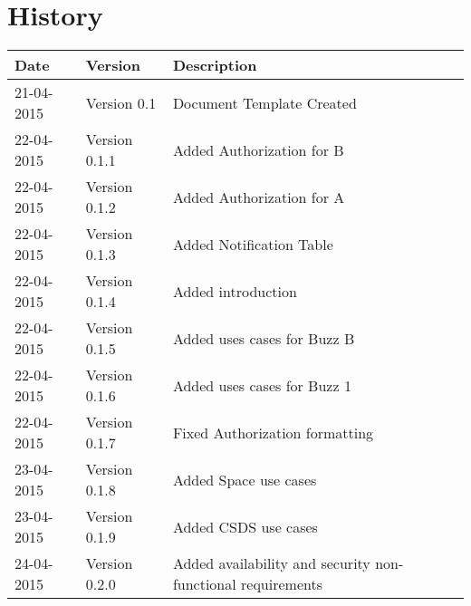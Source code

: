 \documentclass[12pt]{article}
\begin{document}


\section{History}
\begin{tabular}{|p{3cm}|p{5cm}|p{6cm}|}

\hline
Date & Version & Description\\ %
\hline
21-04-2015 & Version 0.1 & Document Template Created\\ %
\hline
22-04-2015 & Version 0.1.1 & Added Authorization for B\\ %
\hline
22-04-2015 & Version 0.1.2 & Added Authorization for A\\ %
\hline
22-04-2015 & Version 0.1.3 & Added Notification Table\\ %
\hline
22-04-2015 & Version 0.1.4 & Added introduction\\ %
\hline
22-04-2015 & Version 0.1.5 & Added uses cases for Buzz B\\ %
\hline
22-04-2015 & Version 0.1.6 & Added uses cases for Buzz 1\\ %
\hline
22-04-2015 & Version 0.1.7 & Fixed Authorization formatting\\ %
\hline
23-04-2015 & Version 0.1.8 & Added Space use cases\\ %
\hline
23-04-2015 & Version 0.1.9 & Added CSDS use cases\\ %
\hline
24-04-2015 & Version 0.2.0 & Added availability and security non-functional requirements\\ %
\hline
\end{tabular}

\newpage
\tableofcontents
\newpage
\end{document}

